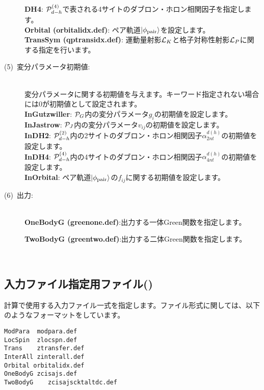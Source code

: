 \begin{description}
~\\{\bf DH4}:  ${\cal P}_{d-h}^{(4)}$で表される4サイトのダブロン・ホロン相関因子を指定します。
~\\{\bf Orbital (orbitalidx.def)}: ペア軌道$|\phi_{\rm pair} \rangle$を設定します。
~\\{\bf TransSym (qptransidx.def)}: 運動量射影${\cal L}_K$と格子対称性射影${\cal L}_P$に関する指定を行います。
\item[(5)~変分パラメータ初期値:]
~\\ 変分パラメータに関する初期値を与えます。キーワード指定されない場合には$0$が初期値として設定されます。
~\\{\bf InGutzwiller}: ${\cal P}_G$内の変分パラメータ$g_i$の初期値を設定します。
~\\{\bf InJastrow}: ${\cal P}_J$内の変分パラメータ$v_{ij}$の初期値を設定します。
~\\{\bf InDH2}:  ${\cal P}_{d-h}^{(2)}$内の2サイトのダブロン・ホロン相関因子$\alpha_{2nt}^{d(h)}$の初期値を設定します。
~\\{\bf InDH4}:  ${\cal P}_{d-h}^{(4)}$内の4サイトのダブロン・ホロン相関因子$\alpha_{4nt}^{d(h)}$の初期値を設定します。
~\\{\bf InOrbital}: ペア軌道$|\phi_{\rm pair} \rangle$の$ f_{ij}$に関する初期値を設定します。


\item[(6)~出力:]
~\\{\bf OneBodyG (greenone.def)}:出力する一体Green関数を指定します。

 {\bf TwoBodyG (greentwo.def)}:出力する二体Green関数を指定します。

\end{description}
\newpage
~\subsection{入力ファイル指定用ファイル()}
\label{Subsec:InputFileList}
計算で使用する入力ファイル一式を指定します。ファイル形式に関しては、以下のようなフォーマットをしています。\\
\begin{minipage}{10cm}
\begin{screen}
\begin{verbatim}
ModPara  modpara.def
LocSpin  zlocspn.def
Trans    ztransfer.def
InterAll zinterall.def
Orbital orbitalidx.def
OneBodyG zcisajs.def
TwoBodyG	zcisajscktaltdc.def
\end{verbatim}
\end{screen}
\end{minipage}
\\
